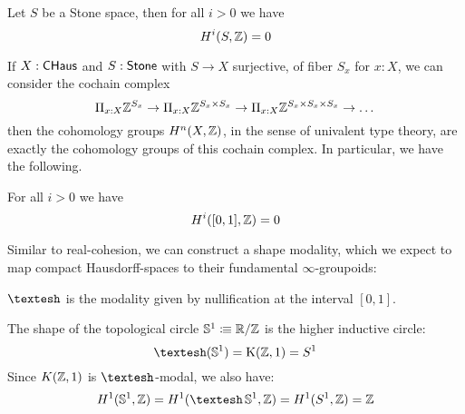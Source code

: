 \begin{theorem}
Let $S$ be a Stone space, then for all $i>0$ we have \[H^i(S,\mathbb{Z}) = 0\]
\end{theorem}

If $X:\mathsf{CHaus}$ and $S:\mathsf{Stone}$ with $S\rightarrow X$ surjective, of fiber $S_x$ for $x:X$,  we can consider the cochain complex
\[\Pi_{x:X}\mathbb{Z}^{S_x}\rightarrow \Pi_{x:X}\mathbb{Z}^{S_x\times S_x}\rightarrow \Pi_{x:X}\mathbb{Z}^{S_x\times S_x\times S_x}\rightarrow\dots\]
then the cohomology groups $H^n(X,\mathbb{Z})$, in the sense of univalent type theory, are exactly the cohomology groups of this
cochain complex. In particular, we have the following.

\begin{proposition}
For all $i>0$ we have \[H^i([0,1],\mathbb{Z}) = 0\]
\end{proposition}

Similar to real-cohesion, we can construct a shape modality, which we expect to map compact Hausdorff-spaces to their fundamental $\infty$-groupoids:

\begin{definition}
  $\shape$ is the modality given by nullification at the interval $[0,1]$.
\end{definition}

\begin{proposition}
  The shape of the topological circle $\mathbb{S}^1\vcentcolon\mspace{-1.2mu}\equiv \mathbb{R}/\mathbb{Z}$ is the higher inductive circle: 
  \[
  \shape(\bS^1)=\mathrm{K}(\Z,1)=S^1
  \]
  Since $K(\mathbb{Z},1)$ is $\shape$-modal, we also have:
  \[
  H^1(\bS^1,\Z) = H^1(\shape \bS^1,\Z) = H^1(S^1,\Z) = \Z
  \]
\end{proposition}

